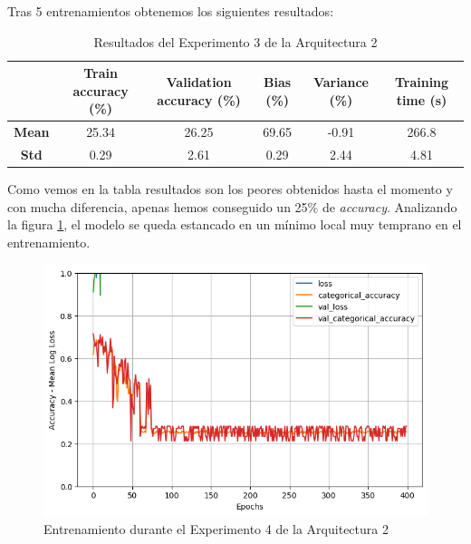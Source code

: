 \documentclass{article}
\begin{document}
			\newpage
			Tras 5 entrenamientos obtenemos los siguientes resultados:
			
			\begin{table}[!h]
				\begin{center}
					\begin{tabular}{ c | c | c | c | c | c |}
						\ & \textbf{Train accuracy (\%)} & \textbf{Validation accuracy (\%)} & \textbf{Bias (\%)} & \textbf{Variance (\%)} & \textbf{Training time (s)} \\ \hline
						\textbf{Mean} & 25.34 & 26.25 & 69.65 & -0.91 & 266.8 \\ \hline
						\textbf{Std} & 0.29 & 2.61 & 0.29 & 2.44 & 4.81 \\ \hline
					\end{tabular}
					\caption{Resultados del Experimento 3 de la Arquitectura 2}
					\label{tab:res-d-a2-e3}
				\end{center}
			\end{table}
			
			Como vemos en la tabla resultados son los peores obtenidos hasta el momento y con mucha diferencia, apenas hemos conseguido un 25\% de \textit{accuracy}. Analizando la figura \ref{d-tr-a2-e3}, el modelo se queda estancado en un m\'inimo local muy temprano en el entrenamiento.
			\begin{figure}[!h]
				\begin{center}
					\includegraphics[scale=0.5]{d-tr-a2-e3.png}		
					\caption{Entrenamiento durante el Experimento 4 de la Arquitectura 2}	
					\label{d-tr-a2-e3}
				\end{center}
			\end{figure}
			
\end{document}
